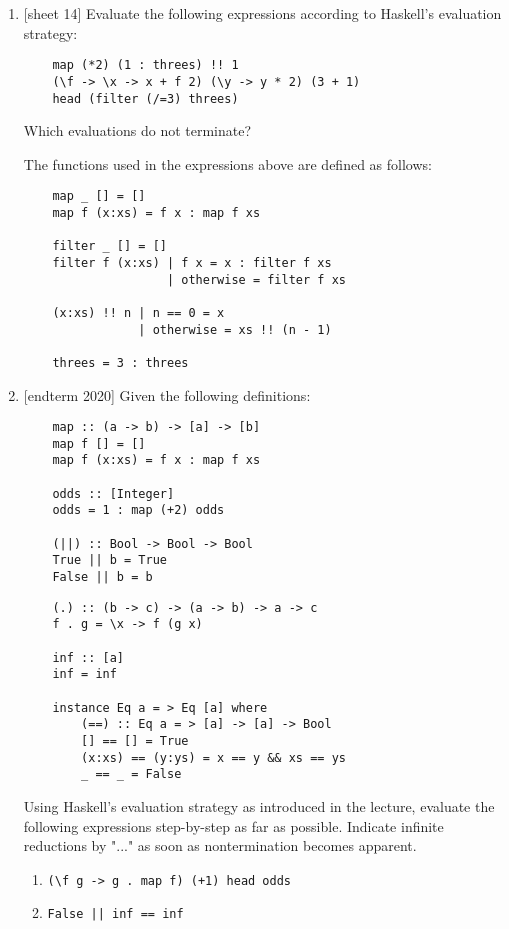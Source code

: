 \documentclass{article}
\def\code#1{\texttt{#1}}
\begin{document}
\begin{enumerate}
    \item {[sheet 14]} Evaluate the following expressions according to Haskell's evaluation strategy:
        \begin{verbatim}
    map (*2) (1 : threes) !! 1
    (\f -> \x -> x + f 2) (\y -> y * 2) (3 + 1)
    head (filter (/=3) threes)
        \end{verbatim}
        Which evaluations do not terminate? \par
        The functions used in the expressions above are defined as follows:
        \begin{verbatim}
    map _ [] = []
    map f (x:xs) = f x : map f xs

    filter _ [] = []
    filter f (x:xs) | f x = x : filter f xs
                    | otherwise = filter f xs

    (x:xs) !! n | n == 0 = x
                | otherwise = xs !! (n - 1)

    threes = 3 : threes
        \end{verbatim}

    \item {[endterm 2020]} Given the following definitions:
        \begin{multicols}{2}
        \begin{verbatim}
    map :: (a -> b) -> [a] -> [b]
    map f [] = []
    map f (x:xs) = f x : map f xs

    odds :: [Integer]
    odds = 1 : map (+2) odds

    (||) :: Bool -> Bool -> Bool
    True || b = True
    False || b = b
        \end{verbatim}
        \begin{verbatim}
    (.) :: (b -> c) -> (a -> b) -> a -> c
    f . g = \x -> f (g x)

    inf :: [a]
    inf = inf

    instance Eq a = > Eq [a] where
        (==) :: Eq a = > [a] -> [a] -> Bool
        [] == [] = True
        (x:xs) == (y:ys) = x == y && xs == ys
        _ == _ = False
        \end{verbatim}
        \end{multicols}
        Using Haskell's evaluation strategy as introduced in the lecture, evaluate the following expressions step-by-step as far as possible. Indicate infinite reductions by "..." as soon as nontermination becomes apparent.
        \begin{enumerate}
            \item \code{(\textbackslash f g -> g . map f) (+1) head odds}
            \item \code{False || inf == inf}
        \end{enumerate}
\end{enumerate}
\end{document}
